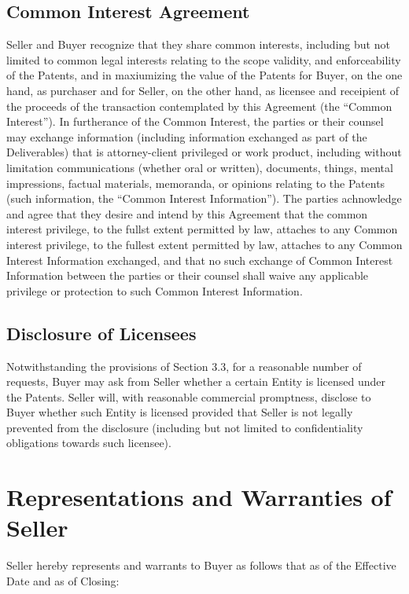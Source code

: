 \documentclass[letterpaper,10pt,english]{sphinxmanual}
\begin{document}
\subsection{Common Interest Agreement}
\label{\detokenize{5-additionalobligations:common-interest-agreement}}
Seller and Buyer recognize that they share common interests, including but not limited to common legal interests relating to the scope validity, and enforceability of the Patents, and in maxiumizing the value of the Patents for Buyer, on the one hand, as purchaser and for Seller, on the other hand, as licensee and receipient of the proceeds of the transaction contemplated by this Agreement (the “Common Interest”). In furtherance of the Common Interest, the parties or their counsel may exchange information (including information exchanged as part of the Deliverables) that is attorney-client privileged or work product, including without limitation communications (whether oral or written), documents, things, mental impressions, factual materials, memoranda, or opinions relating to the Patents (such information, the “Common Interest Information”). The parties achnowledge and agree that they desire and intend by this Agreement that the common interest privilege, to the fullst extent permitted by law, attaches to any Common interest privilege, to the fullest extent permitted by law, attaches to any Common Interest Information exchanged, and that no such exchange of Common Interest Information between the parties or their counsel shall waive any applicable privilege or protection to such Common Interest Information.


\subsection{Disclosure of Licensees}
\label{\detokenize{5-additionalobligations:disclosure-of-licensees}}
Notwithstanding the provisions of Section 3.3, for a reasonable number of requests, Buyer may ask from Seller whether a certain Entity is licensed under the Patents. Seller will, with reasonable commercial promptness, disclose to Buyer whether such Entity is licensed provided that Seller is not legally prevented from the disclosure (including but not limited to confidentiality obligations towards such licensee).


\section{Representations and Warranties of Seller}
\label{\detokenize{6-representations:representations-and-warranties-of-seller}}\label{\detokenize{6-representations::doc}}
Seller hereby represents and warrants to Buyer as follows that as of the Effective Date and as of Closing:
\end{document}
